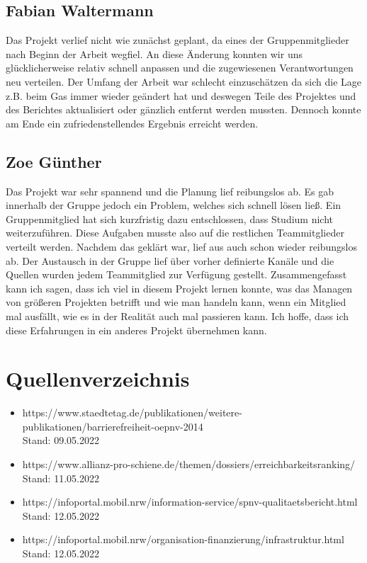 \documentclass[a4paper,12pt]{scrartcl}
\begin{document}
\subsection{Fabian Waltermann}
Das Projekt verlief nicht wie zunächst geplant, da eines der Gruppenmitglieder nach Beginn der Arbeit wegfiel. An diese Änderung konnten wir uns glücklicherweise relativ schnell anpassen und die zugewiesenen Verantwortungen neu verteilen. Der Umfang der Arbeit war schlecht einzuschätzen da sich die Lage z.B. beim Gas immer wieder geändert hat und deswegen Teile des Projektes und des Berichtes aktualisiert oder gänzlich entfernt werden mussten. Dennoch konnte am Ende ein zufriedenstellendes Ergebnis erreicht werden.

\subsection{Zoe Günther}
Das Projekt war sehr spannend und die Planung lief reibungslos ab. Es gab innerhalb der Gruppe jedoch ein Problem, welches sich schnell lösen ließ. Ein Gruppenmitglied hat sich kurzfristig dazu entschlossen, dass Studium nicht weiterzuführen. Diese Aufgaben musste also auf die restlichen Teammitglieder verteilt werden. Nachdem das geklärt war, lief aus auch schon wieder reibungslos ab. Der Austausch in der Gruppe lief über vorher definierte Kanäle und die Quellen wurden jedem Teammitglied zur Verfügung gestellt.
Zusammengefasst kann ich sagen, dass ich viel in diesem Projekt lernen konnte, was das Managen von größeren Projekten betrifft und wie man handeln kann, wenn ein Mitglied mal ausfällt, wie es in der Realität auch mal passieren kann. Ich hoffe, dass ich diese Erfahrungen in ein anderes Projekt übernehmen kann.

\newpage
\section{Quellenverzeichnis}
\begin{itemize}
\item https://www.staedtetag.de/publikationen/weitere-publikationen/barrierefreiheit-oepnv-2014 \\ Stand: 09.05.2022
\item https://www.allianz-pro-schiene.de/themen/dossiers/erreichbarkeitsranking/ \\ Stand: 11.05.2022
\item https://infoportal.mobil.nrw/information-service/spnv-qualitaetsbericht.html \\ Stand: 12.05.2022
\item https://infoportal.mobil.nrw/organisation-finanzierung/infrastruktur.html \\ Stand: 12.05.2022
\end{itemize}
\end{document}
